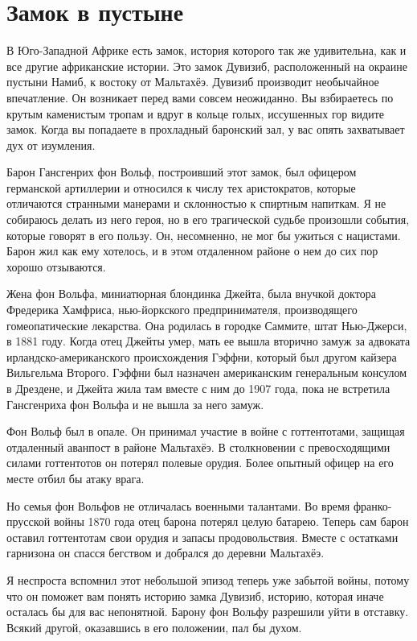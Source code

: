 \documentclass[12pt,a4paper,twoside,openany,svgnames]{memoir}
\begin{document}
\chapter{Замок в пустыне}

В Юго-Западной Африке есть замок, история которого так же удивительна, как и все другие африканские истории. Это замок Дувизиб, расположенный на окраине пустыни Намиб, к востоку от Мальтахёэ. Дувизиб производит необычайное впечатление. Он возникает перед вами совсем неожиданно. Вы взбираетесь по крутым каменистым тропам и вдруг в кольце голых, иссушенных гор видите замок. Когда вы попадаете в прохладный баронский зал, у вас опять захватывает дух от изумления.

Барон Гансгенрих фон Вольф, построивший этот замок, был офицером германской артиллерии и относился к числу тех аристократов, которые отличаются странными манерами и склонностью к спиртным напиткам. Я не собираюсь делать из него героя, но в его трагической судьбе произошли события, которые говорят в его пользу. Он, несомненно, не мог бы ужиться с нацистами. Барон жил как ему хотелось, и в этом отдаленном районе о нем до сих пор хорошо отзываются.

Жена фон Вольфа, миниатюрная блондинка Джейта, была внучкой доктора Фредерика Хамфриса, нью-йоркского предпринимателя, производящего гомеопатические лекарства. Она родилась в городке Саммите, штат Нью-Джерси, в 1881 году. Когда отец Джейты умер, мать ее вышла вторично замуж за адвоката ирландско-американского происхождения Гэффни, который был другом кайзера Вильгельма Второго. Гэффни был назначен американским генеральным консулом в Дрездене, и Джейта жила там вместе с ним до 1907 года, пока не встретила Гансгенриха фон Вольфа и не вышла за него замуж.

Фон Вольф был в опале. Он принимал участие в войне с готтентотами, защищая отдаленный аванпост в районе Мальтахёэ. В столкновении с превосходящими силами готтентотов он потерял полевые орудия. Более опытный офицер на его месте отбил бы атаку врага.

Но семья фон Вольфов не отличалась военными талантами. Во время франко-прусской войны 1870 года отец барона потерял целую батарею. Теперь сам барон оставил готтентотам свои орудия и запасы продовольствия. Вместе с остатками гарнизона он спасся бегством и добрался до деревни Мальтахёэ.

Я неспроста вспомнил этот небольшой эпизод теперь уже забытой войны, потому что он поможет вам понять историю замка Дувизиб, историю, которая иначе осталась бы для вас непонятной. Барону фон Вольфу разрешили уйти в отставку. Всякий другой, оказавшись в его положении, пал бы духом.
\end{document}
